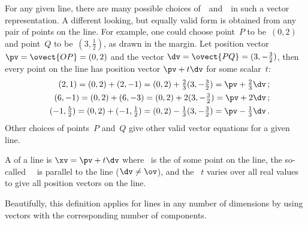 \begin{example}
For any given line, there are many possible choices of~\pv\ and~\dv\ in such a vector representation.
A different looking, but equally valid form is obtained from any pair of points on the line.
For example, one could choose point~\(P\) to be~\((0,2)\) and point~\(Q\) to be~\((3,\tfrac12)\), as drawn in the margin. 
Let position vector \(\pv=\ovect{OP}=(0,2)\) and the vector \(\dv=\ovect{PQ}=(3,-\tfrac32)\), then every point on the line has position vector \(\pv+t\dv\) for some scalar~\(t\):
%
\begin{eqnarray*}&&
(2,1)=(0,2)+(2,-1)=(0,2)+\tfrac23(3,-\tfrac32)=\pv+\tfrac23\dv\,;
\\&&
(6,-1)=(0,2)+(6,-3)=(0,2)+2(3,-\tfrac32)=\pv+2\dv\,;
\\&&
(-1,\tfrac52)=(0,2)+(-1,\tfrac12)=(0,2)-\tfrac13(3,-\tfrac32)=\pv-\tfrac13\dv\,.
\end{eqnarray*}
Other choices of points~\(P\) and~\(Q\) give other valid vector equations for a given line.
\end{example}


\begin{definition} \label{def:parlin}
A  of a line is \(\xv=\pv+t\dv\) where \pv~is the  of some point on the line,  the so-called ~\dv\ is parallel to the line (\(\dv\neq\ov\)), and the  ~\(t\) varies over all real values to give all position vectors on the line.
\end{definition}

Beautifully, this definition applies for lines in any number of dimensions by using vectors with the corresponding number of components.


